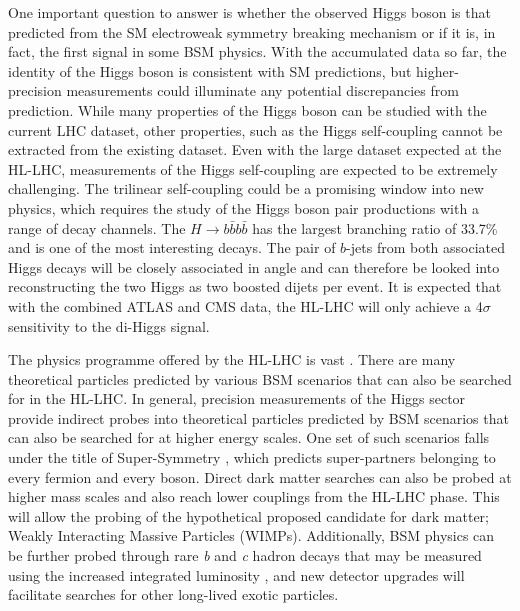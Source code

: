 One important question to answer is whether the observed Higgs boson is that predicted from the SM electroweak symmetry breaking mechanism \cite{ewsb} or if it is, in fact, the first signal in some BSM physics. With the accumulated data so far, the identity of the Higgs boson is consistent with SM predictions, but higher-precision measurements could illuminate any potential discrepancies from prediction. While many properties of the Higgs boson can be studied with the current LHC dataset, other properties, such as the Higgs self-coupling cannot be extracted from the existing dataset. Even with the large dataset expected at the HL-LHC, measurements of the Higgs self-coupling are expected to be extremely challenging. The trilinear self-coupling could be a promising window into new physics, which requires the study of the Higgs boson pair productions with a range of decay channels. The $H \rightarrow b\bar{b}b\bar{b}$ has the largest branching ratio of 33.7\% and is one of the most interesting decays. The pair of $b$-jets from both associated Higgs decays will be closely associated in angle and can therefore be looked into reconstructing the two Higgs as two boosted dijets per event. It is expected that with the combined ATLAS and CMS data, the HL-LHC will only achieve a 4$\sigma$ sensitivity to the di-Higgs signal.


The physics programme offered by the HL-LHC is vast \cite{big-report}. There are many theoretical particles predicted by various BSM scenarios that can also be searched for in the HL-LHC. In general, precision measurements of the Higgs sector provide indirect probes into theoretical particles predicted by BSM scenarios that can also be searched for at higher energy scales. One set of such scenarios falls under the title of Super-Symmetry \cite{supersym}, which predicts super-partners belonging to every fermion and every boson. Direct dark matter searches can also be probed at higher mass scales and also reach lower couplings from the HL-LHC phase. This will allow the probing of the hypothetical proposed candidate for dark matter; Weakly Interacting Massive Particles (WIMPs). Additionally, BSM physics can be further probed through rare \textit{b} and \textit{c} hadron decays that may be measured using the increased integrated luminosity \cite{wg-bsm}, and new detector upgrades will facilitate searches for other long-lived exotic particles.



